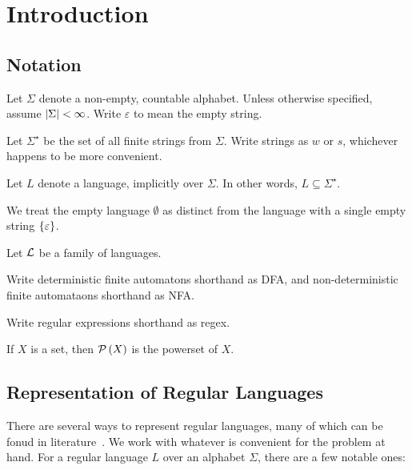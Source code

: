 \section{Introduction}

\subsection{Notation}

Let \(\Sigma\) denote a non-empty, countable alphabet.
Unless otherwise specified, assume \(\left\lvert\Sigma\right\rvert < \infty\).
Write \(\varepsilon\) to mean the empty string.

Let \(\Sigma^\star\) be the set of all finite strings from \(\Sigma\).
Write strings as \(w\) or \(s\), whichever happens to be more convenient.

Let \(L\) denote a language, implicitly over \(\Sigma\).
In other words, \(L \subseteq \Sigma^\star\).

We treat the empty language \(\emptyset\) as distinct from
the language with a single empty string \(\left\{\varepsilon\right\}\).

Let \(\mathcal{L}\) be a family of languages.

Write deterministic finite automatons shorthand as DFA,
and non-deterministic finite automataons shorthand as NFA.

Write regular expressions shorthand as regex.

If \(X\) is a set, then \(\mathcal{P}\left(X\right)\) is the powerset of \(X\).


\subsection{Representation of Regular Languages}
There are several ways to represent regular languages,
many of which can be fonud in literature~\cite{savage1998models}.
We work with whatever is convenient for the problem at hand.
For a regular language \(L\) over an alphabet \(\Sigma\),
there are a few notable ones:


